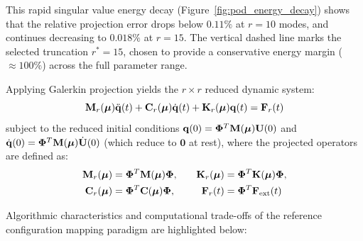 This rapid singular value energy decay (Figure~\ref{fig:pod_energy_decay}) shows that the relative projection error drops below $0.11\%$ at $r=10$ modes, and continues decreasing to $0.018\%$ at $r=15$. The vertical dashed line marks the selected truncation $r^* = 15$, chosen to provide a conservative energy margin ($\approx 100\%$) across the full parameter range.

Applying Galerkin projection yields the $r \times r$ reduced dynamic system:
\begin{equation}
    \mathbf{M}_r(\boldsymbol{\mu}) \ddot{\mathbf{q}}(t) + \mathbf{C}_r(\boldsymbol{\mu}) \dot{\mathbf{q}}(t) + \mathbf{K}_r(\boldsymbol{\mu}) \mathbf{q}(t) = \mathbf{F}_r(t)
\end{equation}
subject to the reduced initial conditions $\mathbf{q}(0) = \boldsymbol{\Phi}^T \mathbf{M}(\boldsymbol{\mu}) \mathbf{U}(0)$ and $\dot{\mathbf{q}}(0) = \boldsymbol{\Phi}^T \mathbf{M}(\boldsymbol{\mu}) \dot{\mathbf{U}}(0)$ (which reduce to $\mathbf{0}$ at rest), where the projected operators are defined as:
\begin{equation}
\begin{aligned}
    \mathbf{M}_r(\boldsymbol{\mu}) &= \boldsymbol{\Phi}^T \mathbf{M}(\boldsymbol{\mu}) \boldsymbol{\Phi}, &\quad \mathbf{K}_r(\boldsymbol{\mu}) &= \boldsymbol{\Phi}^T \mathbf{K}(\boldsymbol{\mu}) \boldsymbol{\Phi}, \\
    \mathbf{C}_r(\boldsymbol{\mu}) &= \boldsymbol{\Phi}^T \mathbf{C}(\boldsymbol{\mu}) \boldsymbol{\Phi}, &\quad \mathbf{F}_r(t) &= \boldsymbol{\Phi}^T \mathbf{F}_{\text{ext}}(t)
\end{aligned}
\end{equation}

Algorithmic characteristics and computational trade-offs of the reference configuration mapping paradigm are highlighted below:

